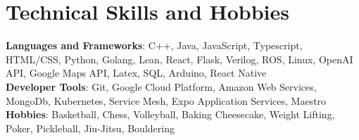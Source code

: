 \documentclass[letterpaper,11pt]{article}
\begin{document}
%
\section{Technical Skills and Hobbies}
 \begin{itemize}[leftmargin=0.15in, label={}]
    \small{\item{
     \textbf{Languages and Frameworks}{: C++, Java, JavaScript, Typescript, HTML/CSS, Python, Golang, Lean, React, Flask, Verilog, ROS, Linux, OpenAI API, 
     Google Maps API, Latex, SQL, Arduino, React Native}\vspace{5pt} \\
     \textbf{Developer Tools}{: Git, Google Cloud Platform, Amazon Web Services, MongoDb, Kubernetes, Service Mesh, Expo Application Services, Maestro\vspace{5pt}} \\
     \textbf{Hobbies}{: Basketball,  Chess, Volleyball, Baking Cheesecake, Weight Lifting, Poker, Pickleball, Jiu-Jitsu, Bouldering}
    }}
 \end{itemize}


\end{document}
